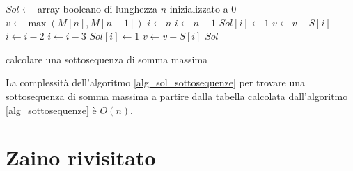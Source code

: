 \begin{algorithm}
\begin{algorithmic}
    \State $Sol \gets$ array booleano di lunghezza $n$ inizializzato a 0
    \State $v \gets \max (M[n], M[n-1])$
        \State $i \gets n$
    \Else
        \State $i \gets n - 1$
    \EndIf
    \State $Sol[i] \gets 1$
    \State $v \gets v - S[i]$
            \State $i \gets i - 2$
        \Else
            \State $i \gets i - 3$
        \EndIf
        \State $Sol[i] \gets 1$
        \State $v \gets v - S[i]$
    \EndWhile
    \State \Return $Sol$
\EndFunction
\end{algorithmic}
\caption{\label{alg_sol_sottosequenze}calcolare una sottosequenza di somma massima}
\end{algorithm}

La complessit\`a dell'algoritmo \ref{alg_sol_sottosequenze} per trovare una sottosequenza di somma massima a partire dalla tabella calcolata dall'algoritmo \ref{alg_sottosequenze} \`e $O(n)$.

\clearpage

\section{Zaino rivisitato}

